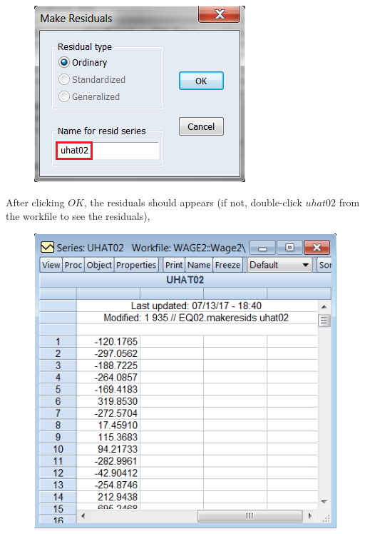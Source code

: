 \documentclass[12pt]{report}
\begin{document}
\vspace{-\baselineskip}
\begin{figure}[H]
	\centering
	\includegraphics{q3_26}
\end{figure}
\vspace{-\baselineskip}
\noindent After clicking $OK$, the residuals should appears (if not, double-click $uhat02$ from the workfile to see the residuals),
\begin{figure}[H]
	\centering
	\includegraphics{q3_27}
\end{figure}
\end{document}
